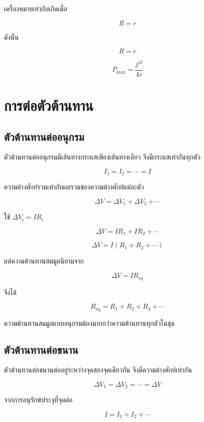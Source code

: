 เครื่องหมายเท่ากับเกิดเมื่อ

\[
R=r
\]

ดังนั้น

\begin{tcolorbox}[title={เงื่อนไขส่งกำลังสูงสุดให้โหลด}]
\[
\boxed{R=r}
\]

\[
\boxed{P_{\max}=\frac{\mathcal{E}^2}{4r}}
\]
\end{tcolorbox}

\section{การต่อตัวต้านทาน}

\subsection{ตัวต้านทานต่ออนุกรม}

ตัวต้านทานต่ออนุกรมมีเส้นทางกระแสเพียงเส้นทางเดียว จึงมีกระแสเท่ากันทุกตัว

\[
I_1=I_2=\cdots=I
\]

ความต่างศักย์รวมเท่ากับผลรวมของความต่างศักย์แต่ละตัว

\[
\Delta V=\Delta V_1+\Delta V_2+\cdots
\]

ใช้ $\Delta V_i=IR_i$

\[
\Delta V=IR_1+IR_2+\cdots
\]

\[
\Delta V=I(R_1+R_2+\cdots)
\]

แต่ความต้านทานสมมูลนิยามจาก

\[
\Delta V=IR_{\text{eq}}
\]

จึงได้

\begin{tcolorbox}[title={ตัวต้านทานต่ออนุกรม}]
\[
\boxed{R_{\text{eq}}=R_1+R_2+R_3+\cdots}
\]
\end{tcolorbox}

ความต้านทานสมมูลแบบอนุกรมต้องมากกว่าความต้านทานทุกตัวในชุด

\subsection{ตัวต้านทานต่อขนาน}

ตัวต้านทานต่อขนานต่ออยู่ระหว่างจุดสองจุดเดียวกัน จึงมีความต่างศักย์เท่ากัน

\[
\Delta V_1=\Delta V_2=\cdots=\Delta V
\]

จากการอนุรักษ์ประจุที่จุดต่อ

\[
I=I_1+I_2+\cdots
\]

